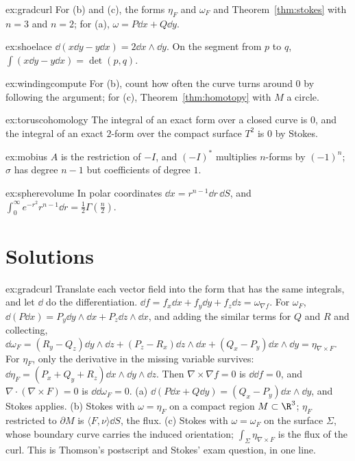 \begin{hint}{ex:gradcurl}
For (b) and (c), the forms $\eta_F$ and $\omega_F$ and Theorem~\ref{thm:stokes} with $n=3$ and $n=2$; for (a), $\omega=P\dd x+Q\dd y$.
\end{hint}
\begin{hint}{ex:shoelace}
$\dd(x\dd y-y\dd x)=2\dd x\wedge\dd y$. On the segment from $p$ to $q$, $\int(x\dd y-y\dd x)=\det(p,q)$.
\end{hint}
\begin{hint}{ex:windingcompute}
For (b), count how often the curve turns around $0$ by following the argument; for (c), Theorem~\ref{thm:homotopy} with $M$ a circle.
\end{hint}
\begin{hint}{ex:toruscohomology}
The integral of an exact form over a closed curve is $0$, and the integral of an exact $2$-form over the compact surface $T^2$ is $0$ by Stokes.
\end{hint}
\begin{hint}{ex:mobius}
$A$ is the restriction of $-I$, and $(-I)^*$ multiplies $n$-forms by $(-1)^n$; $\sigma$ has degree $n-1$ but coefficients of degree $1$.
\end{hint}
\begin{hint}{ex:spherevolume}
In polar coordinates $\dd x=r^{n-1}\dd r\,\dd S$, and $\int_0^\infty e^{-r^2}r^{n-1}\dd r=\frac12\Gamma(\frac n2)$.
\end{hint}

\section{Solutions}

\begin{solution}{ex:gradcurl}
\idea Translate each vector field into the form that has the same integrals, and let $\dd$ do the differentiation.
\writeup $\dd f=f_x\dd x+f_y\dd y+f_z\dd z=\omega_{\nabla f}$. For $\omega_F$, $\dd(P\dd x)=P_y\dd y\wedge\dd x+P_z\dd z\wedge\dd x$, and adding the similar terms for $Q$ and $R$ and collecting,
$\dd\omega_F=(R_y-Q_z)\dd y\wedge\dd z+(P_z-R_x)\dd z\wedge\dd x+(Q_x-P_y)\dd x\wedge\dd y=\eta_{\nabla\times F}$. For $\eta_F$, only the derivative in the missing variable survives:
$\dd\eta_F=(P_x+Q_y+R_z)\dd x\wedge\dd y\wedge\dd z$. Then $\nabla\times\nabla f=0$ is $\dd\dd f=0$, and $\nabla\cdot(\nabla\times F)=0$ is $\dd\dd\omega_F=0$. (a) $\dd(P\dd x+Q\dd y)=(Q_x-P_y)\dd x\wedge\dd y$,
and Stokes applies. (b) Stokes with $\omega=\eta_F$ on a compact region $M\subset\R^3$; $\eta_F$ restricted to $\partial M$ is $\langle F,\nu\rangle\dd S$, the flux. (c) Stokes with
$\omega=\omega_F$ on the surface $\Sigma$, whose boundary curve carries the induced orientation; $\int_\Sigma\eta_{\nabla\times F}$ is the flux of the curl. This is
Thomson's postscript and Stokes' exam question, in one line.
\end{solution}

